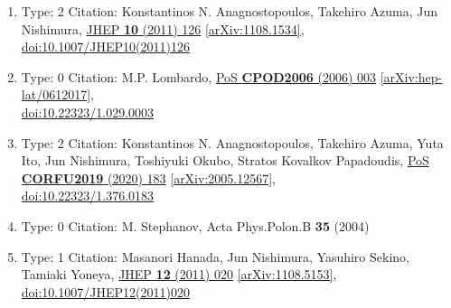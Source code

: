 \documentclass[a4paper,10pt]{article}
\begin{document}
\begin{enumerate}
\begin{enumerate}
  \item Type: 2 Citation: Konstantinos N. Anagnostopoulos, Takehiro Azuma, Jun Nishimura, \href{https://www.doi.org/10.1007/JHEP10(2011)126}{JHEP {\bf 10} (2011) 126}  \href{https://arxiv.org/abs/1108.1534}{[arXiv:1108.1534]},\\\href{https://www.doi.org/10.1007/JHEP10(2011)126}{doi:10.1007/JHEP10(2011)126}
  \item Type: 0 Citation: M.P. Lombardo, \href{https://www.doi.org/10.22323/1.029.0003}{PoS {\bf CPOD2006} (2006) 003}  \href{https://arxiv.org/abs/hep-lat/0612017}{[arXiv:hep-lat/0612017]},\\\href{https://www.doi.org/10.22323/1.029.0003}{doi:10.22323/1.029.0003}
  \item Type: 2 Citation: Konstantinos N. Anagnostopoulos, Takehiro Azuma, Yuta Ito, Jun Nishimura, Toshiyuki Okubo, Stratos Kovalkov Papadoudis, \href{https://www.doi.org/10.22323/1.376.0183}{PoS {\bf CORFU2019} (2020) 183}  \href{https://arxiv.org/abs/2005.12567}{[arXiv:2005.12567]},\\\href{https://www.doi.org/10.22323/1.376.0183}{doi:10.22323/1.376.0183}
  \item Type: 0 Citation: M. Stephanov, Acta Phys.Polon.B {\bf 35} (2004) 
  \item Type: 1 Citation: Masanori Hanada, Jun Nishimura, Yasuhiro Sekino, Tamiaki Yoneya, \href{https://www.doi.org/10.1007/JHEP12(2011)020}{JHEP {\bf 12} (2011) 020}  \href{https://arxiv.org/abs/1108.5153}{[arXiv:1108.5153]},\\\href{https://www.doi.org/10.1007/JHEP12(2011)020}{doi:10.1007/JHEP12(2011)020}

\end{enumerate}
\end{enumerate}
\end{document}
